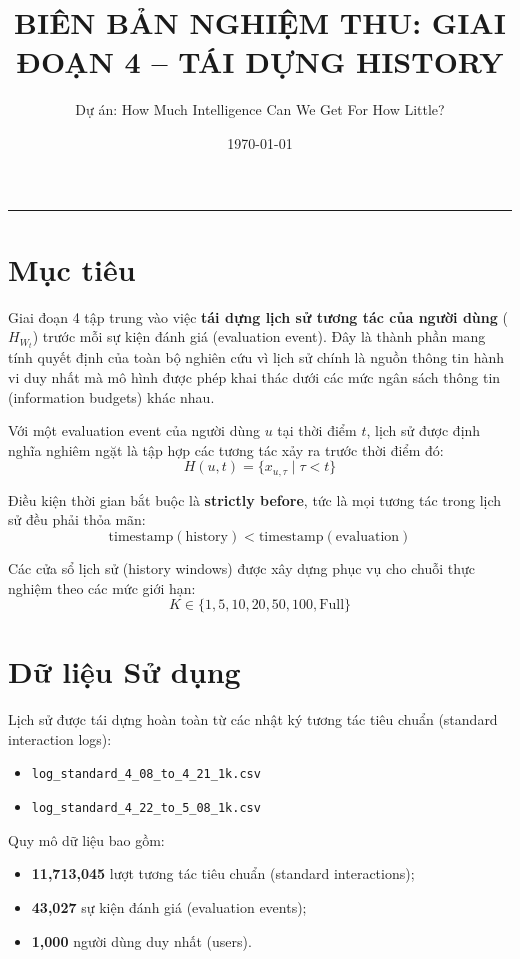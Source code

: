 \documentclass[12pt,a4paper]{article}
\title{\textbf{BIÊN BẢN NGHIỆM THU: GIAI ĐOẠN 4 -- TÁI DỰNG HISTORY}}
\author{Dự án: How Much Intelligence Can We Get For How Little?}
\date{\today}
\begin{document}
\maketitle
\hrule
\vspace{15pt}

\section{Mục tiêu}
Giai đoạn 4 tập trung vào việc \textbf{tái dựng lịch sử tương tác của người dùng} ($H_{W_t}$) trước mỗi sự kiện đánh giá (evaluation event). Đây là thành phần mang tính quyết định của toàn bộ nghiên cứu vì lịch sử chính là nguồn thông tin hành vi duy nhất mà mô hình được phép khai thác dưới các mức ngân sách thông tin (information budgets) khác nhau.

Với một evaluation event của người dùng $u$ tại thời điểm $t$, lịch sử được định nghĩa nghiêm ngặt là tập hợp các tương tác xảy ra trước thời điểm đó:
$$H(u,t) = \{x_{u,\tau} \mid \tau < t\}$$

Điều kiện thời gian bắt buộc là \textbf{strictly before}, tức là mọi tương tác trong lịch sử đều phải thỏa mãn:
$$\text{timestamp}(\text{history}) < \text{timestamp}(\text{evaluation})$$

Các cửa sổ lịch sử (history windows) được xây dựng phục vụ cho chuỗi thực nghiệm theo các mức giới hạn:
$$K \in \{1, 5, 10, 20, 50, 100, \text{Full}\}$$

\section{Dữ liệu Sử dụng}
Lịch sử được tái dựng hoàn toàn từ các nhật ký tương tác tiêu chuẩn (standard interaction logs):
\begin{itemize}[noitemsep]
    \item \texttt{log\_standard\_4\_08\_to\_4\_21\_1k.csv}
    \item \texttt{log\_standard\_4\_22\_to\_5\_08\_1k.csv}
\end{itemize}

Quy mô dữ liệu bao gồm:
\begin{itemize}[noitemsep]
    \item \textbf{11,713,045} lượt tương tác tiêu chuẩn (standard interactions);
    \item \textbf{43,027} sự kiện đánh giá (evaluation events);
    \item \textbf{1,000} người dùng duy nhất (users).
\end{itemize}
\end{document}
